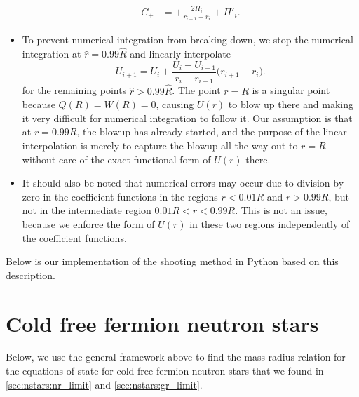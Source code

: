 \begin{itemize}
\begin{subequations}
\begin{align}
          C_+             &= +\frac{2 \Pi_i}{r_{i+1}-r_i} + \Pi'_i .
      \end{align}
      \end{subequations}
\item To prevent numerical integration from breaking down, we stop the numerical integration at $\hat{r} = 0.99 \hat{R}$ and linearly interpolate
      \begin{equation}
          U_{i+1} = U_i + \frac{U_i - U_{i-1}}{r_i - r_{i-1}} \Big( r_{i+1} - r_i \Big) .
      \end{equation}
      for the remaining points $\hat{r} > 0.99 \hat{R}$.
      The point $r=R$ is a singular point because $Q(R) = W(R) = 0$, causing $U(r)$ to blow up there and making it very difficult for numerical integration to follow it.
      Our assumption is that at $r = 0.99 R$, the blowup has already started, and the purpose of the linear interpolation is merely to capture the blowup all the way out to $r=R$ without care of the exact functional form of $U(r)$ there.
\item It should also be noted that numerical errors may occur due to division by zero in the coefficient functions in the regions $r < 0.01 R$ and $r > 0.99 R$, but not in the intermediate region $0.01 R < r < 0.99 R$.
      This is not an issue, because we enforce the form of $U(r)$ in these two regions independently of the coefficient functions.
\end{itemize}

Below is our implementation of the shooting method in Python based on this description.



\section{Cold free fermion neutron stars}

Below, we use the general framework above to find the mass-radius relation for the equations of state for cold free fermion neutron stars that we found in \cref{sec:nstars:nr_limit} and \cref{sec:nstars:gr_limit}.

